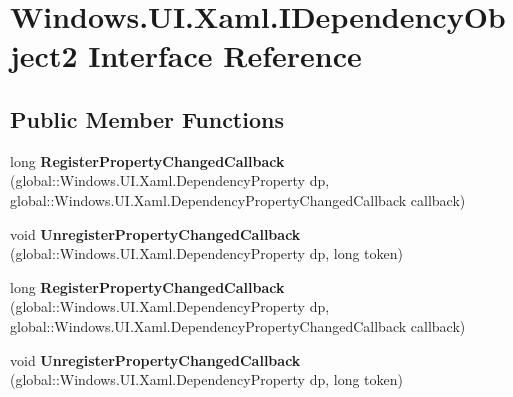 \hypertarget{interface_windows_1_1_u_i_1_1_xaml_1_1_i_dependency_object2}{}\section{Windows.\+U\+I.\+Xaml.\+I\+Dependency\+Object2 Interface Reference}
\label{interface_windows_1_1_u_i_1_1_xaml_1_1_i_dependency_object2}
\subsection*{Public Member Functions}
\begin{DoxyCompactItemize}
\item 
\mbox{\label{interface_windows_1_1_u_i_1_1_xaml_1_1_i_dependency_object2_a282537e2e0f85c3c33e27bd45967c7bf}} 
long {\bfseries Register\+Property\+Changed\+Callback} (global\+::\+Windows.\+U\+I.\+Xaml.\+Dependency\+Property dp, global\+::\+Windows.\+U\+I.\+Xaml.\+Dependency\+Property\+Changed\+Callback callback)
\item 
\mbox{\label{interface_windows_1_1_u_i_1_1_xaml_1_1_i_dependency_object2_a6201834ef34b95fe7fcf094389da6edf}} 
void {\bfseries Unregister\+Property\+Changed\+Callback} (global\+::\+Windows.\+U\+I.\+Xaml.\+Dependency\+Property dp, long token)
\item 
\mbox{\label{interface_windows_1_1_u_i_1_1_xaml_1_1_i_dependency_object2_a282537e2e0f85c3c33e27bd45967c7bf}} 
long {\bfseries Register\+Property\+Changed\+Callback} (global\+::\+Windows.\+U\+I.\+Xaml.\+Dependency\+Property dp, global\+::\+Windows.\+U\+I.\+Xaml.\+Dependency\+Property\+Changed\+Callback callback)
\item 
\mbox{\label{interface_windows_1_1_u_i_1_1_xaml_1_1_i_dependency_object2_a6201834ef34b95fe7fcf094389da6edf}} 
void {\bfseries Unregister\+Property\+Changed\+Callback} (global\+::\+Windows.\+U\+I.\+Xaml.\+Dependency\+Property dp, long token)
\item 
\mbox{\label{interface_windows_1_1_u_i_1_1_xaml_1_1_i_dependency_object2_a282537e2e0f85c3c33e27bd45967c7bf}} 

\end{DoxyCompactItemize}
